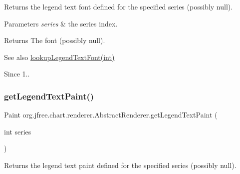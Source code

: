 Returns the legend text font defined for the specified series (possibly {\ttfamily null}).


\begin{DoxyParams}{Parameters}
{\em series} & the series index.\\
\hline
\end{DoxyParams}
\begin{DoxyReturn}{Returns}
The font (possibly {\ttfamily null}).
\end{DoxyReturn}
\begin{DoxySeeAlso}{See also}
\mbox{\hyperlink{classorg_1_1jfree_1_1chart_1_1renderer_1_1_abstract_renderer_a8c66e75fd350dabc054247edc4323492}{lookup\+Legend\+Text\+Font(int)}}
\end{DoxySeeAlso}
\begin{DoxySince}{Since}
1.. 
\end{DoxySince}
\mbox{\label{classorg_1_1jfree_1_1chart_1_1renderer_1_1_abstract_renderer_a7249535cd3bccc3a15d81e80aae52de5}} 
\subsubsection{\texorpdfstring{get\+Legend\+Text\+Paint()}{getLegendTextPaint()}}
{\footnotesize\ttfamily Paint org.\+jfree.\+chart.\+renderer.\+Abstract\+Renderer.\+get\+Legend\+Text\+Paint (\begin{DoxyParamCaption}\item[{int}]{series }\end{DoxyParamCaption})}

Returns the legend text paint defined for the specified series (possibly {\ttfamily null}).


